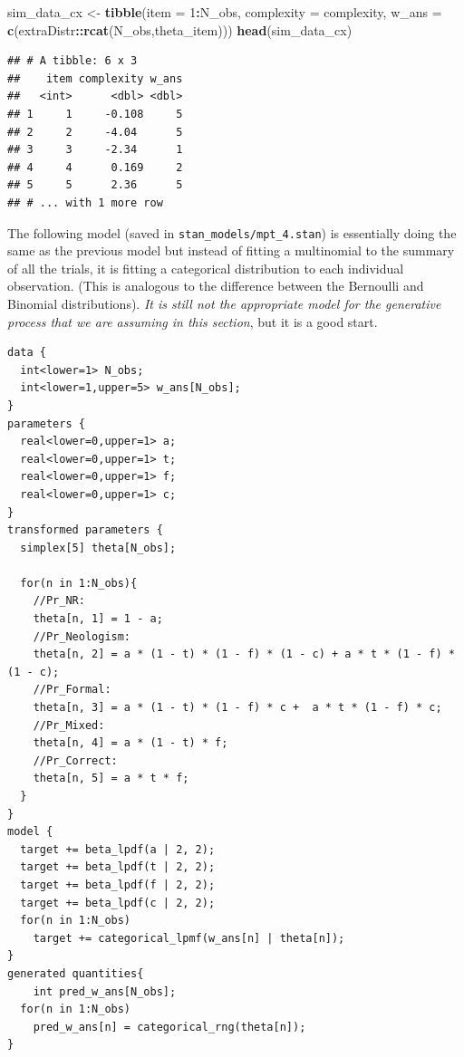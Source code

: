 \documentclass[12pt,]{krantz}
\newenvironment{Shaded}{\begin{snugshade}}{\end{snugshade}}
\newcommand{\KeywordTok}[1]{\textcolor[rgb]{0.13,0.29,0.53}{\textbf{#1}}}
\newcommand{\DataTypeTok}[1]{\textcolor[rgb]{0.13,0.29,0.53}{#1}}
\newcommand{\DecValTok}[1]{\textcolor[rgb]{0.00,0.00,0.81}{#1}}
\newcommand{\StringTok}[1]{\textcolor[rgb]{0.31,0.60,0.02}{#1}}
\newcommand{\OperatorTok}[1]{\textcolor[rgb]{0.81,0.36,0.00}{\textbf{#1}}}
\newcommand{\NormalTok}[1]{#1}
\theoremstyle{definition}
\theoremstyle{definition}
\theoremstyle{definition}
\theoremstyle{remark}
\begin{document}
\begin{Shaded}
\begin{Highlighting}[]
\NormalTok{sim_data_cx <-}\StringTok{ }\KeywordTok{tibble}\NormalTok{(}\DataTypeTok{item =} \DecValTok{1}\OperatorTok{:}\NormalTok{N_obs,}
                      \DataTypeTok{complexity =}\NormalTok{ complexity,}
                      \DataTypeTok{w_ans =} \KeywordTok{c}\NormalTok{(extraDistr}\OperatorTok{::}\KeywordTok{rcat}\NormalTok{(N_obs,theta_item)))}
\KeywordTok{head}\NormalTok{(sim_data_cx)}
\end{Highlighting}
\end{Shaded}

\begin{verbatim}
## # A tibble: 6 x 3
##    item complexity w_ans
##   <int>      <dbl> <dbl>
## 1     1     -0.108     5
## 2     2     -4.04      5
## 3     3     -2.34      1
## 4     4      0.169     2
## 5     5      2.36      5
## # ... with 1 more row
\end{verbatim}

The following model (saved in \texttt{stan\_models/mpt\_4.stan}) is
essentially doing the same as the previous model but instead of fitting
a multinomial to the summary of all the trials, it is fitting a
categorical distribution to each individual observation. (This is
analogous to the difference between the Bernoulli and Binomial
distributions). \emph{It is still not the appropriate model for the
generative process that we are assuming in this section}, but it is a
good start.

\begin{verbatim}
data {
  int<lower=1> N_obs;
  int<lower=1,upper=5> w_ans[N_obs];
}
parameters {
  real<lower=0,upper=1> a;
  real<lower=0,upper=1> t;
  real<lower=0,upper=1> f;
  real<lower=0,upper=1> c;
}
transformed parameters {
  simplex[5] theta[N_obs];

  for(n in 1:N_obs){
    //Pr_NR:
    theta[n, 1] = 1 - a;
    //Pr_Neologism:
    theta[n, 2] = a * (1 - t) * (1 - f) * (1 - c) + a * t * (1 - f) * (1 - c);
    //Pr_Formal:
    theta[n, 3] = a * (1 - t) * (1 - f) * c +  a * t * (1 - f) * c;
    //Pr_Mixed:
    theta[n, 4] = a * (1 - t) * f;
    //Pr_Correct:
    theta[n, 5] = a * t * f;
  }
}
model {
  target += beta_lpdf(a | 2, 2);
  target += beta_lpdf(t | 2, 2);
  target += beta_lpdf(f | 2, 2);
  target += beta_lpdf(c | 2, 2);
  for(n in 1:N_obs)
    target += categorical_lpmf(w_ans[n] | theta[n]);
}
generated quantities{
    int pred_w_ans[N_obs];
  for(n in 1:N_obs)
    pred_w_ans[n] = categorical_rng(theta[n]);
}
\end{verbatim}
\end{document}
